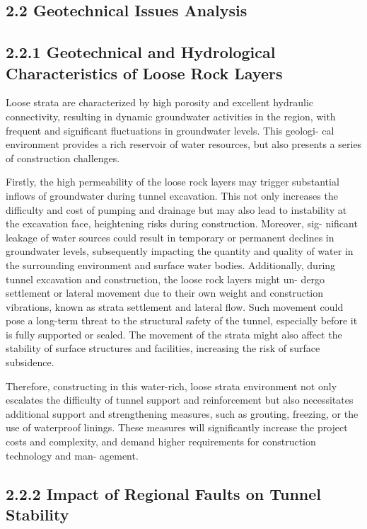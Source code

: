 \documentclass[11pt]{article}
\begin{document}
\subsection*{2.2  Geotechnical Issues Analysis}
\subsection*{2.2.1 Geotechnical and Hydrological Characteristics of Loose Rock Layers}

Loose strata are characterized by high porosity and excellent hydraulic connectivity, resulting in dynamic groundwater activities in the region, with frequent and significant fluctuations in groundwater levels.  This geologi- cal environment provides a rich reservoir of water resources, but also presents a series of construction challenges.

Firstly, the high permeability of the loose rock layers may trigger substantial inflows of groundwater during tunnel excavation.  This not only increases the difficulty and cost of pumping and drainage but may also lead to instability at the excavation face, heightening risks during construction. Moreover, sig- nificant leakage of water sources could result in temporary or permanent declines in groundwater levels, subsequently impacting the quantity and quality of water in the surrounding environment and surface water bodies.  Additionally, during tunnel excavation and construction, the loose rock layers might un- dergo settlement or lateral movement due to their own weight and construction vibrations, known as strata settlement and lateral flow.  Such movement could pose a long-term threat to the structural safety of the tunnel, especially before it is fully supported or sealed.  The movement of the strata might also affect the stability of surface structures and facilities, increasing the risk of surface subsidence.

Therefore, constructing in this water-rich, loose strata environment not only escalates the difficulty of tunnel support and reinforcement but also necessitates additional support and strengthening measures, such as grouting, freezing, or the use of waterproof linings.  These measures will significantly increase the project costs and complexity, and demand higher requirements for construction technology and man- agement.


\subsection*{2.2.2 Impact of Regional Faults on Tunnel Stability}
\end{document}
